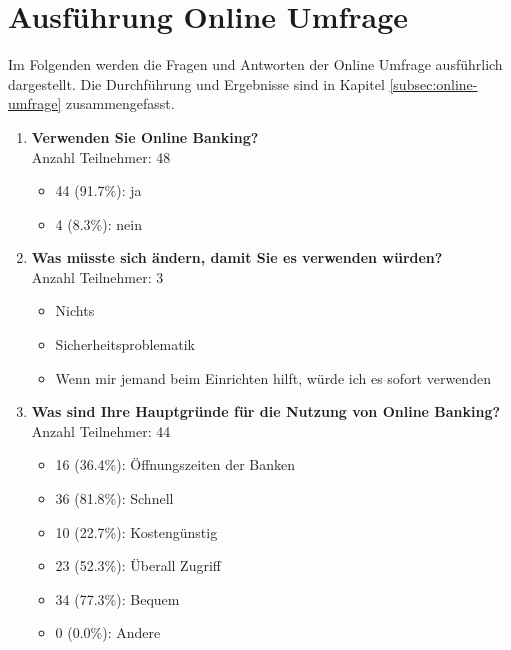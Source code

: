 \section{Ausführung Online Umfrage}
\label{sec:ausfuehrung-online-umfrage}
Im Folgenden werden die Fragen und Antworten der Online Umfrage ausführlich dargestellt. Die Durchführung und Ergebnisse sind in Kapitel \ref{subsec:online-umfrage} zusammengefasst.

\begin{enumerate}
    \item \textbf{Verwenden Sie Online Banking?} \\ Anzahl Teilnehmer: 48
    \begin{itemize}
        \item[] 44 (91.7\%): ja
        \item[] 4 (8.3\%): nein
    \end{itemize}
    
    \item \textbf{Was müsste sich ändern, damit Sie es verwenden würden?}\\ Anzahl Teilnehmer: 3
    \begin{itemize}
        \item[] Nichts
        \item[] Sicherheitsproblematik
        \item[] Wenn mir jemand beim Einrichten hilft, würde ich es sofort verwenden
    \end{itemize}
    
    \item \textbf{Was sind Ihre Hauptgründe für die Nutzung von Online Banking?}\\ Anzahl Teilnehmer: 44
    \begin{itemize}
        \item[] 16 (36.4\%): Öffnungszeiten der Banken
        \item[] 36 (81.8\%): Schnell
        \item[] 10 (22.7\%): Kostengünstig
        \item[] 23 (52.3\%): Überall Zugriff
        \item[] 34 (77.3\%): Bequem
        \item[] 0 (0.0\%): Andere
    \end{itemize}
    

\end{enumerate}
